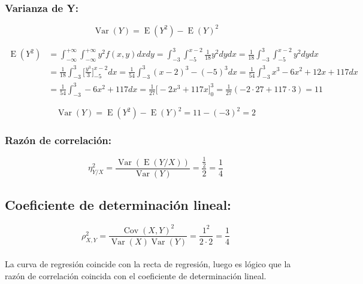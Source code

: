 \documentclass[tikz]{article}
\DeclareMathOperator{\Var}{Var}
\DeclareMathOperator{\Cov}{Cov}
\DeclareMathOperator{\E}{E}
\begin{document}
\newpage

\subsubsection*{Varianza de Y:}

\[\Var(Y)=\E(Y^2)-\E(Y)^2\]

\begin{align*}
  \E(Y^2)&=\int_{-\infty}^{+\infty}\int_{-\infty}^{+\infty}y^2f(x,y)dxdy=\int_{-3}^3\int_{-5}^{x-2}\frac{1}{18}y^2dydx=\frac{1}{18}\int_{-3}^3\int_{-5}^{x-2}y^2dydx \\
         &=\frac{1}{18}\int_{-3}^3\bigg[\frac{y^3}{3}\bigg]_{-5}^{x-2}dx=\frac{1}{54}\int_{-3}^{3}(x-2)^3-(-5)^3dx=\frac{1}{54}\int_{-3}^3x^3-6x^2+12x+117dx \\
         &=\frac{1}{54}\int_{-3}^3-6x^2+117dx=\frac{1}{27}\bigg[-2x^3+117x\bigg]_0^3=\frac{1}{27}(-2\cdot 27+117\cdot 3)=11
\end{align*}

\[\Var(Y)=\E(Y^2)-\E(Y)^2=11-(-3)^2=2\]

\subsubsection*{Razón de correlación:}

\[\eta_{Y/X}^2=\frac{\Var(\E(Y/X))}{\Var(Y)}=\frac{\frac{1}{2}}{2}=\frac{1}{4}\]

\subsection*{Coeficiente de determinación lineal:}

\[\rho_{X,Y}^2=\frac{\Cov(X,Y)^2}{\Var(X)\Var(Y)}=\frac{1^2}{2\cdot2}=\frac{1}{4}\] \\

La curva de regresión coincide con la recta de regresión, luego es
lógico que la razón de correlación coincida con el coeficiente de
determinación lineal.
\end{document}
